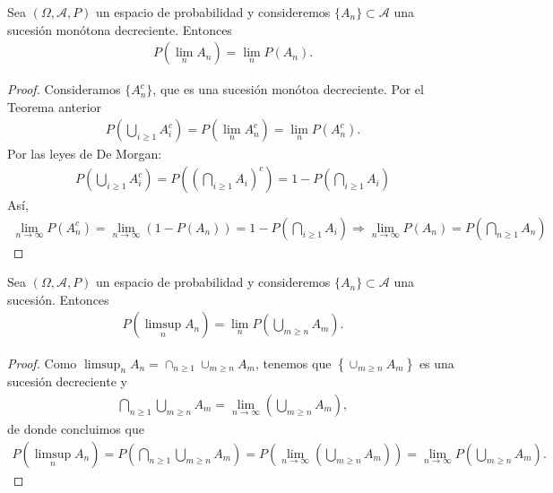 \begin{teo}
    Sea $(\Omega,\mathcal{A},P)$ un espacio de probabilidad y consideremos $\{A_n\} \subset \mathcal{A}$ una sucesión monótona decreciente. Entonces
    \begin{align*}
        P\left( \lim_n A_n \right) = \lim_n P(A_n).
    \end{align*}
\end{teo}

\begin{proof}
    Consideramos $\{A_n^c\}$, que es una sucesión monótoa decreciente. Por el Teorema anterior
    \begin{align*}
        P\left( \bigcup_{i \ge 1} A_i^c \right) = P\left( \lim_n A_n^c \right) = \lim_n P(A_n^c).
    \end{align*}
    Por las leyes de De Morgan:
    \begin{align*}
        P\left( \bigcup_{i \ge 1} A_i^c \right) = P\left( \left( \bigcap_{i \ge 1} A_i \right)^c \right) = 1 - P\left( \bigcap_{i \ge 1} A_i \right)
    \end{align*}
    Así,
    \begin{align*}
        \lim_{n \to \infty} P(A_n^c) = \lim_{n \to \infty} \left( 1 - P(A_n)\right) = 1 - P\left( \bigcap_{i \ge 1} A_i \right) \Longrightarrow \lim_{n \to \infty} P(A_n) = P \left( \bigcap_{n \ge 1} A_n \right)
    \end{align*}
\end{proof}

\begin{teo}
    Sea $(\Omega,\mathcal{A},P)$ un espacio de probabilidad y consideremos $\{A_n\} \subset \mathcal{A}$ una sucesión. Entonces
    \begin{align*}
        P\left( \limsup_n A_n \right) = \lim_n P\left( \bigcup_{m \ge n} A_m \right).
    \end{align*}
\end{teo}

\begin{proof}
    Como $\limsup_n A_n = \cap_{n \ge 1} \cup_{m \ge n} A_m$, tenemos que $\left\{ \cup_{m \ge n} A_m \right\}$ es una sucesión decreciente y
    \begin{align*}
        \bigcap_{n \ge 1} \bigcup_{m \ge n} A_m = \lim_{n \to \infty} \left( \bigcup_{m \ge n} A_m \right),
    \end{align*}
    de donde concluimos que
    \begin{align*}
        P\left( \limsup_n A_n \right) = P\left( \bigcap_{n \ge 1} \bigcup_{m \ge n} A_m  \right) = P\left( \lim_{n \to \infty} \left( \bigcup_{m \ge n} A_m \right) \right) = \lim_{n \to \infty} P\left( \bigcup_{m \ge n} A_m \right).
    \end{align*}
\end{proof}

